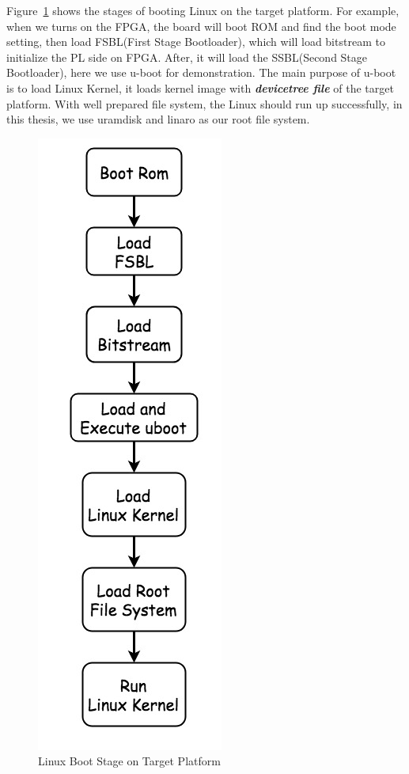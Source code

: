Figure~\ref{fig:Linux Boot Stage on Target Platform} shows the stages of booting Linux on the target platform. For example, when we turns on the FPGA, the board will boot ROM and find the boot mode setting, then load FSBL(First Stage Bootloader), which will load bitstream to initialize the PL side on FPGA. After, it will load the SSBL(Second Stage Bootloader), here we use u-boot for demonstration. The main purpose of u-boot is to load Linux Kernel, it loads kernel image with \textbf{\emph{devicetree file}} of the target platform. With well prepared file system, the Linux should run up successfully, in this thesis, we use uramdisk and linaro\cite{linaro} as our root file system.
\begin{figure}[!htb]
  \centering
  \includegraphics[scale=0.4]{images/linux_boot_stage.jpg}
  \caption[Linux Boot Stage on Target Platform]{Linux Boot Stage on Target Platform}
  \label{fig:Linux Boot Stage on Target Platform}
\end{figure}



